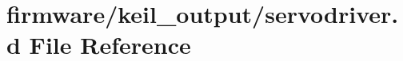 \hypertarget{servodriver_8d}{\section{firmware/keil\-\_\-output/servodriver.d File Reference}
\label{servodriver_8d}
}
